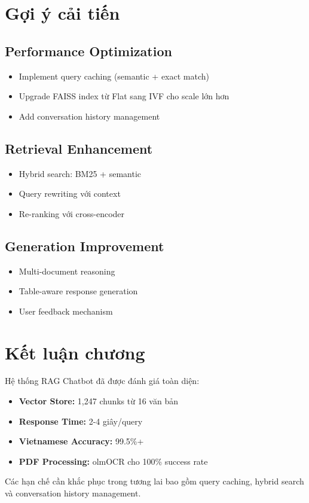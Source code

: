 \documentclass[../DoAn.tex]{subfiles}
\begin{document}
\section{Gợi ý cải tiến}

\subsection{Performance Optimization}
\begin{itemize}
    \item Implement query caching (semantic + exact match)
    \item Upgrade FAISS index từ Flat sang IVF cho scale lớn hơn
    \item Add conversation history management
\end{itemize}

\subsection{Retrieval Enhancement}
\begin{itemize}
    \item Hybrid search: BM25 + semantic
    \item Query rewriting với context
    \item Re-ranking với cross-encoder
\end{itemize}

\subsection{Generation Improvement}
\begin{itemize}
    \item Multi-document reasoning
    \item Table-aware response generation
    \item User feedback mechanism
\end{itemize}

\section{Kết luận chương}

Hệ thống RAG Chatbot đã được đánh giá toàn diện:

\begin{itemize}
    \item \textbf{Vector Store:} 1,247 chunks từ 16 văn bản
    \item \textbf{Response Time:} 2-4 giây/query
    \item \textbf{Vietnamese Accuracy:} 99.5\%+
    \item \textbf{PDF Processing:} olmOCR cho 100\% success rate
\end{itemize}

Các hạn chế cần khắc phục trong tương lai bao gồm query caching, hybrid search và conversation history management.
\end{document}
